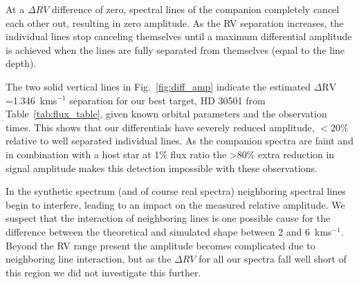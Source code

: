 \documentclass[fleqn,usenatbib]{mnras}
\begin{document}
    At a \(\Delta RV\) difference of zero, spectral lines of the companion completely cancel each other out, resulting in zero amplitude. As the RV separation increases, the individual lines stop canceling themselves until a maximum differential amplitude is achieved when the lines are fully separated from themselves (equal to the line depth). 
    
    The two solid vertical lines in Fig.~\ref{fig:diff_amp} indicate the estimated \(\Delta \textrm{RV}\)=1.346~kms\(^{-1}\) separation for our best target, {HD 30501} from Table~\ref{tab:flux_table}, given known orbital parameters and the observation times. This shows that our differentials have severely reduced amplitude, \(<20\%\) relative to well separated individual lines. As the companion spectra are faint and in combination with a host star at 1\% flux ratio the >80\% extra reduction in signal amplitude makes this detection impossible with these observations.
    
    In the synthetic spectrum (and of course real spectra) neighboring spectral lines begin to interfere, leading to an impact on the measured relative amplitude. We suspect that the interaction of neighboring lines is one possible cause for the difference between the theoretical and simulated shape between 2 and 6~kms\(^{-1}\). Beyond the RV range present the amplitude becomes complicated due to neighboring line interaction, but as the \(\Delta RV\) for all our spectra fall well short of this region we did not investigate this further.
    
\end{document}
